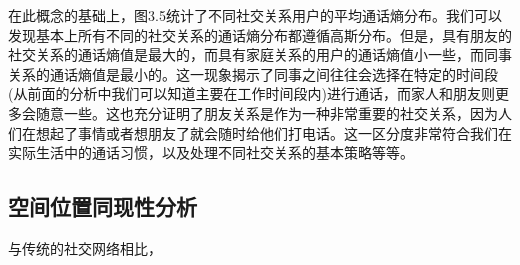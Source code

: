 在此概念的基础上，图3.5统计了不同社交关系用户的平均通话熵分布。我们可以发现基本上所有不同的社交关系的通话熵分布都遵循高斯分布。但是，具有朋友的社交关系的通话熵值是最大的，而具有家庭关系的用户的通话熵值小一些，而同事关系的通话熵值是最小的。这一现象揭示了同事之间往往会选择在特定的时间段(从前面的分析中我们可以知道主要在工作时间段内)进行通话，而家人和朋友则更多会随意一些。这也充分证明了朋友关系是作为一种非常重要的社交关系，因为人们在想起了事情或者想朋友了就会随时给他们打电话。这一区分度非常符合我们在实际生活中的通话习惯，以及处理不同社交关系的基本策略等等。

\subsection{空间位置同现性分析}

与传统的社交网络相比，








































